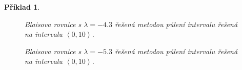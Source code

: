 \documentclass{article}
\newtheorem{example}{Příklad}
\begin{document}
\begin{example}
    \begin{figure}[h]
	\centering
    \def\svgwidth{\textwidth}
	
    \caption{Blaisova rovnice s $\lambda = -4.3$ řešená metodou půlení intervalu řešená na intervalu $\left<0,10 \right>$.}
    \end{figure}

    \begin{figure}[h]
	\centering
    \def\svgwidth{\textwidth}
	
    \caption{Blaisova rovnice s $\lambda = -5.3$ řešená metodou půlení intervalu řešená na intervalu $\left<0,10 \right>$.}
    \end{figure}

\end{example}
\end{document}
